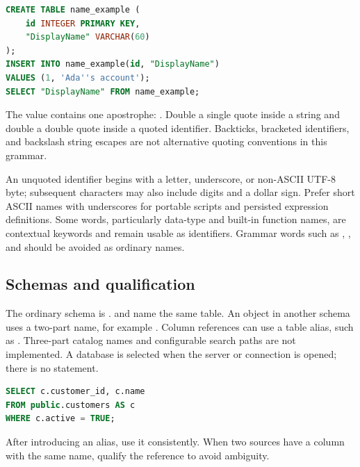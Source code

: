 \begin{lstlisting}[language=SQL]
CREATE TABLE name_example (
    id INTEGER PRIMARY KEY,
    "DisplayName" VARCHAR(60)
);
INSERT INTO name_example(id, "DisplayName")
VALUES (1, 'Ada''s account');
SELECT "DisplayName" FROM name_example;
\end{lstlisting}

The value contains one apostrophe: . Double a single quote inside a string and double a double quote inside a quoted identifier. Backticks, bracketed identifiers, and backslash string escapes are not alternative quoting conventions in this grammar.

An unquoted identifier begins with a letter, underscore, or non-ASCII UTF-8 byte; subsequent characters may also include digits and a dollar sign. Prefer short ASCII names with underscores for portable scripts and persisted expression definitions. Some words, particularly data-type and built-in function names, are contextual keywords and remain usable as identifiers. Grammar words such as , , and  should be avoided as ordinary names.


\subsection{Schemas and qualification}

The ordinary schema is .  and  name the same table. An object in another schema uses a two-part name, for example . Column references can use a table alias, such as . Three-part catalog names and configurable search paths are not implemented. A database is selected when the server or connection is opened; there is no  statement.

\begin{lstlisting}[language=SQL]
SELECT c.customer_id, c.name
FROM public.customers AS c
WHERE c.active = TRUE;
\end{lstlisting}

After introducing an alias, use it consistently. When two sources have a column with the same name, qualify the reference to avoid ambiguity.

